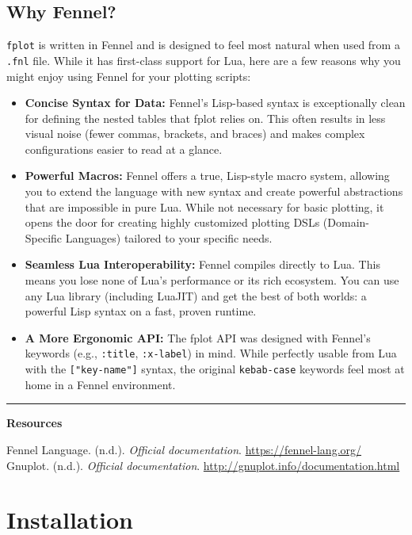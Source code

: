 \documentclass[12pt, letterpaper]{article}
\begin{document}
	\subsection*{Why Fennel?}
	
	\texttt{fplot} is written in Fennel and is designed to feel most natural when used from a \texttt{.fnl} file. While it has first-class support for Lua, here are a few reasons why you might enjoy using Fennel for your plotting scripts:
	
	\begin{itemize}
		\item \textbf{Concise Syntax for Data:} Fennel's Lisp-based syntax is exceptionally clean for defining the nested tables that fplot relies on. This often results in less visual noise (fewer commas, brackets, and braces) and makes complex configurations easier to read at a glance.
		\item \textbf{Powerful Macros:} Fennel offers a true, Lisp-style macro system, allowing you to extend the language with new syntax and create powerful abstractions that are impossible in pure Lua. While not necessary for basic plotting, it opens the door for creating highly customized plotting DSLs (Domain-Specific Languages) tailored to your specific needs.
		\item \textbf{Seamless Lua Interoperability:} Fennel compiles directly to Lua. This means you lose none of Lua's performance or its rich ecosystem. You can use any Lua library (including LuaJIT) and get the best of both worlds: a powerful Lisp syntax on a fast, proven runtime.
		\item \textbf{A More Ergonomic API:} The fplot API was designed with Fennel's keywords (e.g., \texttt{:title}, \texttt{:x-label}) in mind. While perfectly usable from Lua with the \texttt{["key-name"]} syntax, the original \texttt{kebab-case} keywords feel most at home in a Fennel environment.
	\end{itemize}
	
	\noindent\rule{\textwidth}{0.4pt}
	\textbf{Resources}
	
	\noindent
	Fennel Language. (n.d.). \textit{Official documentation}. \url{https://fennel-lang.org/} \\
	Gnuplot. (n.d.). \textit{Official documentation}. \url{http://gnuplot.info/documentation.html}
	
	\newpage
	
	\section{Installation}
	
\end{document}

